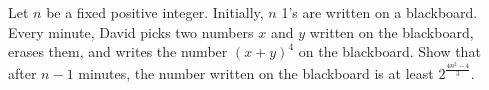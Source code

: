 Let $n$ be a fixed positive integer. Initially, $n$ 1's are written on a blackboard. Every minute, David picks two numbers $x$ and $y$ written on the blackboard, erases them, and writes the number $(x+y)^4$ on the blackboard. Show that after $n-1$ minutes, the number written on the blackboard is at least $2^{\frac{4n^2-4}{3}}$.

